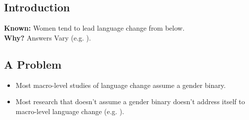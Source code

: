 \documentclass[a0,portrait]{a0poster}
\begin{document}
\begin{multicols}{2} %


\section*{Introduction}

\color{Navy} %
\textbf{\LARGE{Known:}} \Large
Women tend to lead language change from below.\\

\noindent
\color{SaddleBrown}
\textbf{\LARGE{Why?}} Answers Vary (e.g. \citealt{labov2001, eckert2011}).

\color{Navy}
\subsection*{A Problem}

\begin{itemize}
	\item Most macro-level studies of language change assume a gender binary.
	\item Most research that doesn't assume a gender binary doesn't address itself to macro-level language change (e.g. \citet{zimmanetal2014}).
\end{itemize}



\color{DarkSlateGray} %

\end{multicols}
\end{document}
